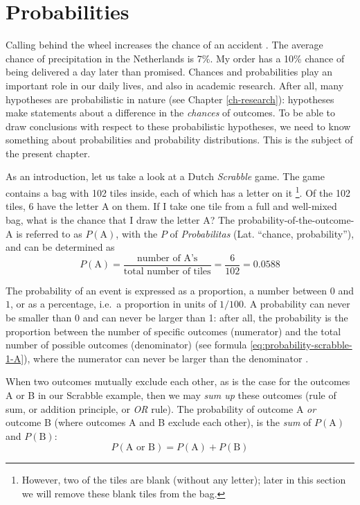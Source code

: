 \documentclass[
]{book}
\begin{document}
\hypertarget{sec:probabilities}{%
\section{Probabilities}\label{sec:probabilities}}

Calling behind the wheel increases the chance of an accident \citep{Bhar13}.
The average chance of precipitation in the Netherlands is 7\%. My order has a
10\% chance of being delivered a day later than promised. Chances and probabilities
play an important role in our daily lives, and also in academic research. After all,
many hypotheses are probabilistic in nature (see Chapter
\ref{ch-research}): hypotheses make statements about a
difference in the \emph{chances} of outcomes. To be able to draw conclusions with
respect to these probabilistic hypotheses, we need to know something about
probabilities and
probability distributions. This is the subject of the present chapter.

As an introduction, let us take a look at a Dutch \emph{Scrabble} game.
The game contains a bag with 102 tiles inside, each of which has a letter on it
\footnote{However, two of the tiles are blank (without any letter); later in this section we will remove these blank tiles from the bag.}. Of the 102 tiles, 6 have the letter A on them. If I take one tile from a
full and well-mixed bag, what is the chance that I draw the letter A? The
probability-of-the-outcome-A is referred to as \(P(\textrm{A})\), with the \(P\) of
\emph{Probabilitas} (Lat. ``chance, probability''), and can be determined as
\begin{equation}
    P(\textrm{A})=
    \frac{\textrm{number of A's}}{\textrm{total number of tiles}}= 
    \frac{6}{102} = 0.0588
  \label{eq:probability-scrabble-1-A}
\end{equation}

The probability of an event is expressed as a proportion, a number between
\(0\) and \(1\), or as a percentage, i.e.~a proportion in units of \(1/100\).
A probability can never be smaller than \(0\) and can never be larger than
1: after all, the probability is the proportion between the number
of specific outcomes (numerator) and the total number of possible outcomes
(denominator) (see
formula \eqref{eq:probability-scrabble-1-A}), where the numerator can never be larger
than the denominator \citep{SK01}.

When two outcomes mutually exclude each other, as is the case for
the outcomes A or B in our Scrabble example, then we may \emph{sum up}
these outcomes (rule of sum, or addition principle, or \emph{OR} rule).
The probability of outcome A \emph{or}
outcome B (where outcomes A and B exclude each other), is the \emph{sum}
of \(P(\textrm{A})\) and \(P(\textrm{B})\):
\begin{equation}
    P(\textrm{A or B}) = P(\textrm{A}) + P(\textrm{B})
  \label{eq:probability-sumrule}
\end{equation}
\end{document}

